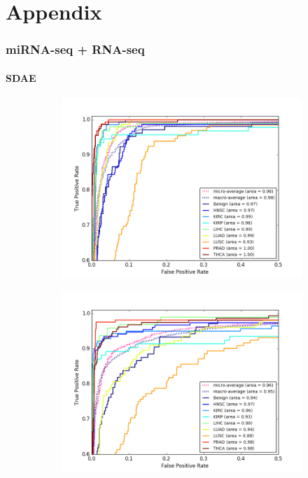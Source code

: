 \chapter{Appendix} \label{chap:Appendix}

\subsection{miRNA-seq + RNA-seq}\label{subsub:m_r_SDAE}

\subsubsection{SDAE}

\begin{figure}[H]
     \centering
     \begin{subfigure}[b]{0.49\textwidth}
         \centering
         \includegraphics[width=\textwidth]{img/m_r/m_r_sdae_dgmu_roc.png}
         \caption{}
     \end{subfigure}
     \hfill
     \begin{subfigure}[b]{0.49\textwidth}
         \centering
         \includegraphics[width=\textwidth]{img/m_r/m_r_sdae_gmu_roc.png}

\end{subfigure}
\end{figure}
